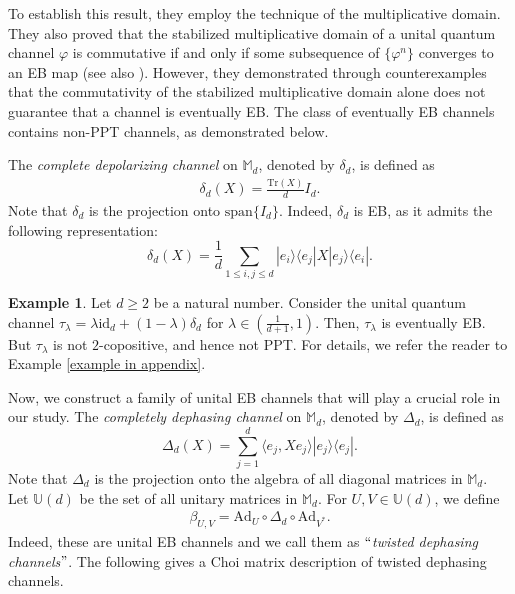 \documentclass[11pt,reqno]{amsart}
\theoremstyle{definition}
\newtheorem{eg}[defn]{Example}
\theoremstyle{plain}
\theoremstyle{remark}
\numberwithin{equation}{section}%
\begin{document}
To establish this result, they employ the technique of the multiplicative domain. They also proved that the stabilized multiplicative domain of a unital quantum channel $\varphi$ is commutative if and only if some subsequence of $\{\varphi^{n}\}$ converges to an EB map (see also \cite{LG}). However, they demonstrated through counterexamples that the commutativity of the stabilized multiplicative domain alone does not guarantee that a channel is eventually EB. The class of eventually EB channels contains non-PPT channels, as demonstrated below. 


The \textit{complete depolarizing channel} on $\mathbb{M}_d$, denoted by $\delta_d$, is defined as
 \begin{align}
 	\delta_d(X)=\frac{\text{Tr}(X)}{d}I_d.
 \end{align}
 Note that $\delta_d$ is the projection onto $\text{span}\{I_d\}$. Indeed, $\delta_d$ is EB, as it admits the following representation: $$\delta_d(X)=\frac{1}{d}\sum_{1\leq i,j\leq d}|e_i\rangle\langle e_j|X|e_j\rangle\langle e_i|.$$ 
 
 
\begin{eg}\label{EMD:eg1}
	Let $d\ge2$ be a natural number. Consider the unital quantum channel $\tau_\lambda=\lambda\text{id}_d+(1-\lambda)\delta_d$ for $\lambda\in (\frac{1}{d+1},1)$. Then, $\tau_\lambda$ is eventually EB. But $\tau_\lambda$ is not $2$-copositive, and hence not PPT. For details, we refer the reader to Example \ref{example in appendix}.
\end{eg}




Now, we construct a family of unital EB channels that will play a crucial role in our study. The \textit{completely dephasing channel} on $\mathbb{M}_d$, denoted by $\Delta_d$, is defined as
 \[\Delta_d(X)=\sum_{j=1}^d \langle e_j,X e_j\rangle|e_j\rangle\langle e_j|.\]
 Note that $\Delta_d$ is the projection onto the algebra of all diagonal matrices in $\mathbb{M}_d$. Let $\mathbb{U}(d)$ be the set of all unitary matrices in $\mathbb{M}_d$. For $U,V\in \mathbb{U}(d)$, we define
 \begin{align}\label{twisted dephasing channel}
 	  \beta_{U,V}=\text{Ad}_U\circ\Delta_d\circ\text{Ad}_{V^*}.
 \end{align}
Indeed, these are unital EB channels and we call them as $``$\textit{twisted dephasing channels}$"$. The following gives a Choi matrix description of twisted dephasing channels.
\end{document}
